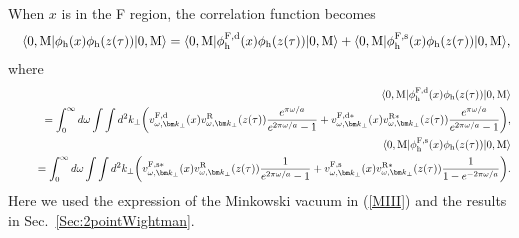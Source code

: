 \documentclass[aps,prd,preprintnumbers,nofootinbib,showpacs]{revtex4}%
\begin{document}
\begin{widetext}
When $x$ is in the F region, the correlation function becomes
\begin{eqnarray}
&&\langle0,{\rm M}| \phi_{\rm h}(x) \phi_{\rm h}(z(\tau))|0,{\rm M}\rangle=
\langle0,{\rm M}| \phi_{\rm h}^{\rm F,d}(x) \phi_{\rm h}(z(\tau))|0,{\rm M}\rangle+
\langle0,{\rm M}| \phi_{\rm h}^{\rm F,s}(x) \phi_{\rm h}(z(\tau))|0,{\rm M}\rangle,
\end{eqnarray}
where 
\begin{eqnarray}
&&\langle0,{\rm M}| \phi_{\rm h}^{\rm F,d}(x) \phi_{\rm h}(z(\tau))|0,{\rm M}\rangle
\nonumber\\
&&~~~~~~=\int_0^{\infty}d\omega\int\int d^2k_\perp\biggl(
v_{\omega,\bm k_\perp}^{\rm F,d}(x)v_{\omega,\bm k_\perp}^{\rm R}(z(\tau))
{e^{\pi\omega/a}\over e^{2\pi\omega/a}-1}
+v_{\omega,\bm k_\perp}^{\rm F,d*}(x)v_{\omega,\bm k_\perp}^{\rm R*}(z(\tau))
{e^{\pi\omega/a}\over e^{2\pi\omega/a}-1}\biggr),
\label{MppM1}
\\
&&\langle0,{\rm M}| \phi_{\rm h}^{\rm F,s}(x) \phi_{\rm h}(z(\tau))|0,{\rm M}\rangle
\nonumber\\
&&~~~~~=
\int_0^{\infty}d\omega\int\int d^2k_\perp\biggl(
v_{\omega,\bm k_\perp}^{\rm  F,s*}(x)v_{\omega,\bm k_\perp}^{\rm R}(z(\tau))
{1\over e^{2\pi\omega/a}-1}
+v_{\omega,\bm k_\perp}^{\rm F,s}(x)v_{\omega,\bm k_\perp}^{\rm R*}(z(\tau))
{1\over 1-e^{-2\pi\omega/a}}
\biggr) .
\label{MppM2}
\end{eqnarray}
Here we used the expression of the Minkowski vacuum in (\ref{MIII}) and 
the results in Sec.~\ref{Sec:2pointWightman}.


\end{widetext}
\end{document}
